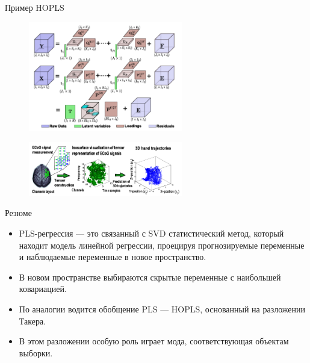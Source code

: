 \begin{frame}{Пример HOPLS}
\begin{figure}
    \centering
    \includegraphics[width=0.6\textwidth]{lecture_10/figs/HOPLS.png}
\end{figure}
\begin{figure}
    \centering
    \includegraphics[width=0.6\textwidth]{lecture_10/figs/HOPLS_example.png}
\end{figure}

\end{frame}
\begin{frame}{Резюме}
\begin{itemize}
    \item PLS-регрессия --- это связанный с SVD статистический метод, который находит модель линейной регрессии, проецируя прогнозируемые переменные и наблюдаемые переменные в новое пространство.
    \item В новом пространстве выбираются скрытые переменные с наибольшей ковариацией. 
    \item По аналогии водится обобщение PLS --- HOPLS, основанный на разложении Такера.
    \item В этом разложении особую роль играет мода, соответствующая объектам выборки.
\end{itemize}
\end{frame}
 